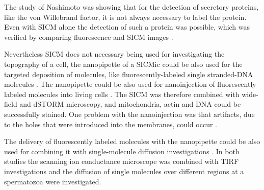 The study of Nashimoto was showing that for the detection of secretory proteins, like the von 
Willebrand factor, it is not always necessary to label the protein. Even with SICM alone the 
detection of such a protein was possible, which was verified by comparing fluorescence and SICM 
images \cite{Nashimoto2015}.

Nevertheless SICM does not necessary being used for investigating the topography of a cell, 
the nanopipette of a SICMic could be also used for the targeted deposition of molecules, like 
fluorescently-labeled single stranded-DNA molecules \cite{Ying2002,Hennig2015}. The nanopipette 
could be also used for nanoinjection of fluorescently labeled molecules into living cells 
\cite{Hennig2015_nanoinj}. The SICM was therefore combined with wide-field and dSTORM microscopy, 
and mitochondria, actin and DNA could be successfully stained. One problem with the nanoinjection 
was that artifacts, due to the holes that were introduced into the membranes, could occur 
\cite{Hennig2015_nanoinj}.

The delivery of fluorescently labeled molecules with the nanopipette could be also used for 
combining it with single-molecule diffusion investigations \cite{Bruckbauer2007, Bruckbauer2010}. 
In both studies the scanning ion conductance microscope was combined with TIRF investigations and 
the diffusion of single molecules over different regions at a spermatozoa were investigated. 

